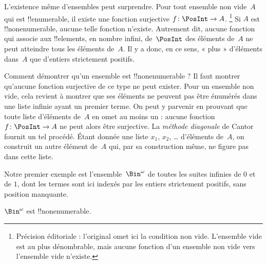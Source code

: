 \documentclass[11pt,a4paper,openany]{memoir}
\begin{document}
L’existence même d’ensembles  peut
surprendre. Pour tout ensemble non vide~$A$ qui est !!{enumerable},
il existe une fonction surjective $f \colon \PosInt \to A$.
\footnote{Précision éditoriale : l’original omet ici la condition
non vide. L’ensemble vide est au plus dénombrable, mais aucune
fonction d’un ensemble non vide vers l’ensemble vide n’existe.}
Si $A$ est !!{nonenumerable}, aucune telle fonction n’existe.
Autrement dit, aucune fonction qui associe aux !!{element}s,
en nombre infini, de~$\PosInt$ des éléments de~$A$ ne peut atteindre
tous les éléments de~$A$. Il y a donc, en ce sens, « plus »
d’éléments dans~$A$ que d’entiers strictement positifs.

Comment démontrer qu’un ensemble est !!{nonenumerable} ?
Il faut montrer qu’aucune fonction surjective de ce type ne peut
exister. Pour un ensemble non vide, cela revient à montrer que
ses éléments ne peuvent pas être énumérés dans une liste infinie
ayant un premier terme. On peut y parvenir en prouvant que toute
liste d’éléments de~$A$ en omet au moins un : aucune fonction
$f\colon \PosInt \to A$ ne peut alors être surjective.
La \emph{méthode diagonale} de Cantor fournit un tel procédé.
Étant donnée une liste $x_1$, $x_2$, \dots{} d’éléments de~$A$,
on construit un autre élément de~$A$ qui, par sa construction
même, ne figure pas dans cette liste.

Notre premier exemple est l’ensemble~$\Bin^\omega$ de toutes
les suites infinies de $0$ et de $1$, dont les termes sont ici
indexés par les entiers strictement positifs, sans position manquante.

\begin{thm}
$\Bin^\omega$ est !!{nonenumerable}.
\end{thm}
\end{document}
